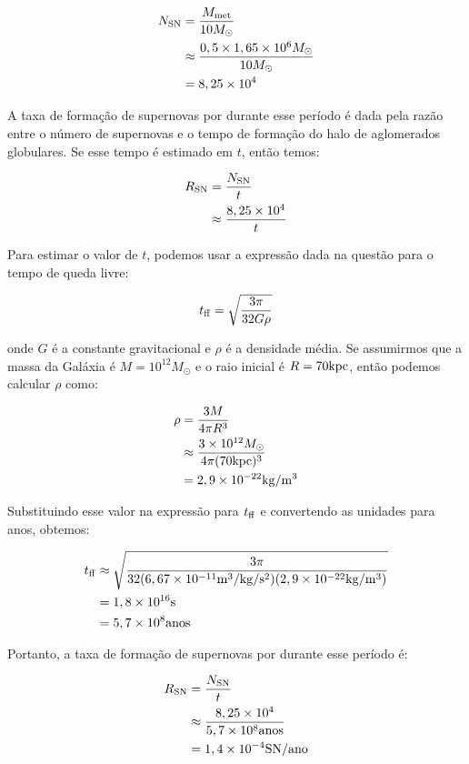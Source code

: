 \documentclass[a4paper,12pt]{article}
\begin{document}
\begin{enumerate}
\begin{enumerate}
\begin{align*}
N_{\rm SN} &= \frac{M_{\rm met}}{10 M_\odot} \\
&\approx \frac{0,5 \times 1,65 \times 10^6 M_\odot}{10 M_\odot} \\
&= 8,25 \times 10^4
\end{align*}

A taxa de formação de supernovas por durante esse período é dada pela razão entre o número de supernovas e o tempo de formação do halo de aglomerados globulares. Se esse tempo é estimado em $t$, então temos:

\begin{align*}
R_{\rm SN} &= \frac{N_{\rm SN}}{t} \\
&\approx \frac{8,25 \times 10^4}{t}
\end{align*}

Para estimar o valor de $t$, podemos usar a expressão dada na questão para o tempo de queda livre:

$$t_{\rm ff} = \sqrt{\frac{3\pi}{32 G \rho}}$$

onde $G$ é a constante gravitacional e $\rho$ é a densidade média. Se assumirmos que a massa da Galáxia é $M = 10^{12} M_\odot$ e o raio inicial é $R = 70 {\rm kpc}$, então podemos calcular $\rho$ como:

\begin{align*}
\rho &= \frac{3M}{4\pi R^3} \\
&\approx \frac{3\times 10^{12} M_\odot}{4\pi (70 {\rm kpc})^3} \\
&= 2,9\times 10^{-22} {\rm kg/m^3}
\end{align*}

Substituindo esse valor na expressão para $t_{\rm ff}$ e convertendo as unidades para anos, obtemos:

\begin{align*}
t_{\rm ff} &\approx \sqrt{\frac{3\pi}{32 (6,67\times 10^{-11} {\rm m^3/kg/s^2}) (2,9\times 10^{-22} {\rm kg/m^3})}} \\
&= 1,8\times 10^{16} {\rm s} \\
&= 5,7\times 10^8 {\rm anos}
\end{align*}

Portanto, a taxa de formação de supernovas por durante esse período é:

\begin{align*}
R_{\rm SN} &= \frac{N_{\rm SN}}{t} \\
&\approx \frac{8,25 \times 10^4}{5,7\times 10^8 {\rm anos}} \\
&= 1,4\times 10^{-4} {\rm SN/ano}
\end{align*}


\end{enumerate}
\end{enumerate}
\end{document}
